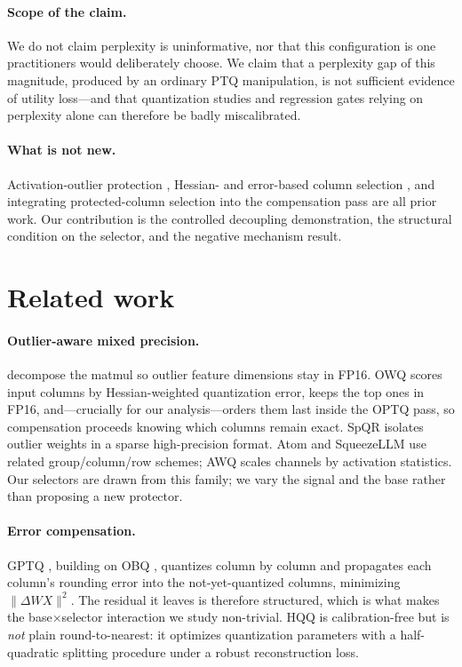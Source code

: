 \documentclass[11pt]{article}
\begin{document}
\paragraph{Scope of the claim.} We do not claim perplexity is uninformative, nor that this
configuration is one practitioners would deliberately choose. We claim that a perplexity gap of
this magnitude, produced by an ordinary PTQ manipulation, is not sufficient evidence of utility
loss---and that quantization studies and regression gates relying on perplexity alone can
therefore be badly miscalibrated.

\paragraph{What is not new.} Activation-outlier protection
\citep{dettmers2022llmint8}, Hessian- and error-based column selection
\citep{lee2024owq,dettmers2023spqr}, and integrating protected-column selection into the
compensation pass \citep{lee2024owq} are all prior work. Our contribution is the controlled
decoupling demonstration, the structural condition on the selector, and the negative mechanism
result.

\section{Related work}
\label{sec:related}

\paragraph{Outlier-aware mixed precision.} \citet{dettmers2022llmint8} decompose the matmul so
outlier feature dimensions stay in FP16. OWQ \citep{lee2024owq} scores input columns by
Hessian-weighted quantization error, keeps the top ones in FP16, and---crucially for our
analysis---orders them last inside the OPTQ pass, so compensation proceeds knowing which
columns remain exact. SpQR \citep{dettmers2023spqr} isolates outlier weights in a sparse
high-precision format. Atom \citep{zhao2024atom} and SqueezeLLM \citep{kim2023squeezellm} use
related group/column/row schemes; AWQ \citep{lin2024awq} scales channels by activation
statistics. Our selectors are drawn from this family; we vary the signal and the base rather
than proposing a new protector.

\paragraph{Error compensation.} GPTQ \citep{frantar2023gptq}, building on OBQ
\citep{frantar2022obc}, quantizes column by column and propagates each column's rounding error
into the not-yet-quantized columns, minimizing $\lVert \Delta W X \rVert^2$. The residual it
leaves is therefore structured, which is what makes the base$\times$selector interaction we
study non-trivial. HQQ \citep{badri2023hqq} is calibration-free but is \emph{not} plain
round-to-nearest: it optimizes quantization parameters with a half-quadratic splitting
procedure under a robust reconstruction loss.
\end{document}
